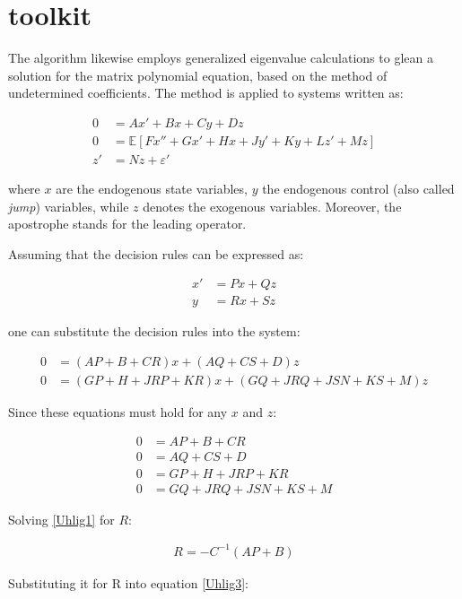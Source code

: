 \documentclass{pracamgr}
\numberwithin{equation}{section}
\begin{document}
\section{\citet{uhlig1998toolkit} toolkit}

The \citet{uhlig1998toolkit} algorithm likewise employs generalized eigenvalue calculations to glean a solution for the matrix polynomial equation, based on the method of undetermined coefficients. The method is applied to systems written as:

\begin{align}
0 &= Ax' + Bx + Cy + Dz \nonumber \\
0 &=\mathbb{E} \left[Fx'' + Gx' + Hx + Jy' + Ky + Lz' + Mz \right] \nonumber \\
z' &= Nz + \varepsilon'
\end{align}

where $x$ are the endogenous state variables, $y$ the endogenous control (also called \textit{jump}) variables, while $z$ denotes the exogenous variables. Moreover, the apostrophe stands for the leading operator.

Assuming that the decision rules can be expressed as:

\begin{align}
x' &= Px + Qz \nonumber \\
y &= Rx + Sz
\end{align}

one can substitute the decision rules into the system:

\begin{align}
0 &= (AP+B+CR)x+(AQ+CS+D)z \nonumber \\
0 &= (GP+H+JRP+KR)x+(GQ+JRQ+JSN+KS+M)z
\end{align}

Since these equations must hold for any $x$ and $z$:

\begin{align}
0 &= AP+B+CR  \label{Uhlig1} \\
0 &= AQ+CS+D  \label{Uhlig2} \\
0 &= GP+H+JRP+KR  \label{Uhlig3} \\
0 &= GQ+JRQ+JSN+KS+M \label{Uhlig4}
\end{align}

Solving \ref{Uhlig1} for $R$:

\begin{align}
R = -C^{-1} \left(AP + B \right)
\end{align}

Substituting it for R into equation \ref{Uhlig3}:
\end{document}
